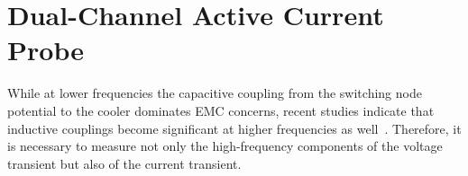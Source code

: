 

\chapter{Dual-Channel Active Current Probe}
\label{ch:AShunt}

While at lower frequencies the capacitive coupling from the switching node potential to the cooler dominates EMC concerns, recent studies indicate that inductive couplings become significant at higher frequencies as well~\cite{hamami_identifying_2026}.
Therefore, it is necessary to measure not only the high-frequency components of the voltage transient but also of the current transient.



